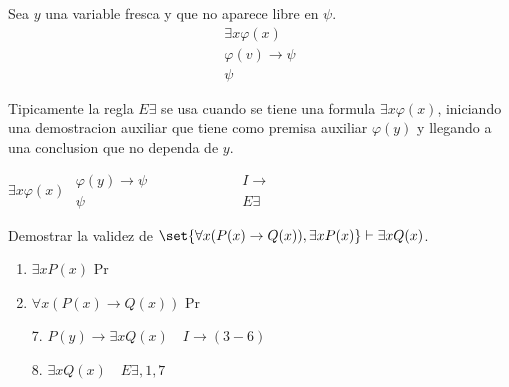 \begin{definition}
	Sea \(y \) una variable fresca y que no aparece libre en \(\psi \).
	\[
		\begin{array}{c}
			\exists  x \varphi(x) \\
			\varphi(v) \to \psi   \\ \hline
			\psi
		\end{array}
	\]
\end{definition}

\begin{remark}
	Tipicamente la regla \(E \exists  \) se usa cuando se tiene una formula \(\exists  x \varphi(x) \), iniciando una demostracion auxiliar que tiene como premisa auxiliar \(\varphi(y )\) y llegando a una conclusion que no dependa de \(y \).
	\begin{center}
		\begin{minipage}{0.4\textwidth}
			\(\exists x \varphi(x)\)
			\(
			\begin{array}{lr}
				\varphi(y) \rightarrow \psi \qquad\qquad\qquad & I \rightarrow \\
				\psi                                           & E \exists
			\end{array}
			\)
		\end{minipage}
	\end{center}
\end{remark}

\begin{example}
	Demostrar la validez de \(\set{\forall x (P(x) \to Q(x)), \exists x P(x)} \vdash \exists x Q(x )\).

	\begin{enumerate}
		\item \(\exists x P(x )\) Pr
		\item \(\forall x (P(x) \to Q(x ))\) Pr
	\end{enumerate}
	\begin{enumerate}
		\item[7.] \(P(y) \to \exists x Q(x) \quad I\to (3-6 )\)
		\item[8.] \(\exists x Q(x) \quad E \exists , 1,7 \)
	\end{enumerate}
\end{example}

